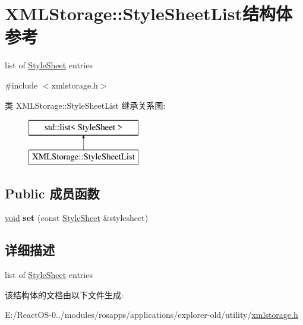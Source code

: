 \hypertarget{struct_x_m_l_storage_1_1_style_sheet_list}{}\section{X\+M\+L\+Storage\+:\+:Style\+Sheet\+List结构体 参考}
\label{struct_x_m_l_storage_1_1_style_sheet_list}


list of \hyperlink{struct_x_m_l_storage_1_1_style_sheet}{Style\+Sheet} entries  




{\ttfamily \#include $<$xmlstorage.\+h$>$}

类 X\+M\+L\+Storage\+:\+:Style\+Sheet\+List 继承关系图\+:\begin{figure}[H]
\begin{center}
\leavevmode
\includegraphics[height=2.000000cm]{struct_x_m_l_storage_1_1_style_sheet_list}
\end{center}
\end{figure}
\subsection*{Public 成员函数}
\begin{DoxyCompactItemize}
\item 
\mbox{\label{struct_x_m_l_storage_1_1_style_sheet_list_a0ba10bba7947528d705783cb24f21478}} 
\hyperlink{interfacevoid}{void} {\bfseries set} (const \hyperlink{struct_x_m_l_storage_1_1_style_sheet}{Style\+Sheet} \&stylesheet)
\end{DoxyCompactItemize}


\subsection{详细描述}
list of \hyperlink{struct_x_m_l_storage_1_1_style_sheet}{Style\+Sheet} entries 

该结构体的文档由以下文件生成\+:\begin{DoxyCompactItemize}
\item 
E\+:/\+React\+O\+S-\/0../modules/rosapps/applications/explorer-\/old/utility/\hyperlink{xmlstorage_8h}{xmlstorage.\+h}\end{DoxyCompactItemize}
